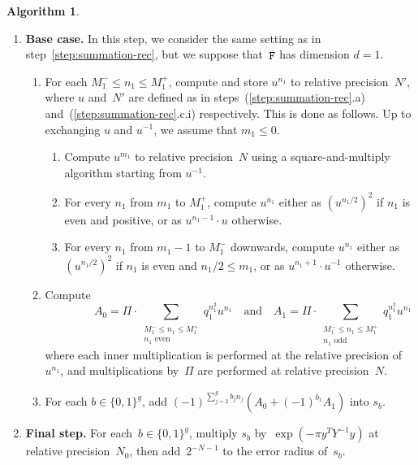 \documentclass[12pt,oneside]{amsart}
\numberwithin{equation}{section}
\theoremstyle{definition}
\newtheorem{algorithm}[equation]{Algorithm}
\DeclareMathOperator{\eldF}{\tt F}
\begin{document}
\begin{algorithm}
\begin{enumerate}
  \item \label{step:summation-base} \textbf{Base case.} In this step, we consider
    the same setting as in step~\eqref{step:summation-rec}, but we suppose
    that~$\eldF$ has dimension $d=1$.
    \begin{enumerate}
    \item For each $M_1^-\leq n_1\leq M_1^+$, compute and store $u^{n_1}$ to
      relative precision~$N'$, where $u$ and~$N'$ are defined as in
      steps~(\ref{step:summation-rec}.a) and~(\ref{step:summation-rec}.c.i)
      respectively. This is done as follows. Up to exchanging $u$ and $u^{-1}$,
      we assume that $m_1\leq 0$.
      \begin{enumerate}
      \item Compute $u^{m_1}$ to relative precision~$N$ using a
        square-and-multiply algorithm starting from $u^{-1}$.
      \item For every $n_1$ from $m_1$ to $M_1^+$, compute $u^{n_1}$ either as
        $(u^{n_1/2})^2$ if $n_1$ is even and positive, or as $u^{n_1-1} \cdot u$ otherwise.
      \item For every $n_1$ from $m_1-1$ to $M_1^-$ downwards, compute
        $u^{n_1}$ either as $(u^{n_1/2})^2$ if $n_1$ is even and
        $n_1/2 \leq m_1$, or as $u^{n_1+1}\cdot u^{-1}$ otherwise.
      \end{enumerate}
    \item Compute
      \begin{displaymath}
        \qquad\qquad
        A_0 = \Pi\cdot \sum_{\substack{M_1^-\leq n_1\leq M_1^+\\ n_1 \text{ even}}} q_1^{n_1^2} u^{n_1}
        \quad\text{and}\quad
        A_1 = \Pi\cdot \sum_{\substack{M_1^-\leq n_1\leq M_1^+\\ n_1 \text{ odd}}} q_1^{n_1^2} u^{n_1}
      \end{displaymath}
      where each inner multiplication is performed at the relative precision
      of~$u^{n_1}$, and multiplications by~$\Pi$ are performed at relative
      precision~$N$.
    \item For each $b\in \{0,1\}^g$, add $(-1)^{\sum_{j=2}^g b_j n_j} (A_0 + (-1)^{b_1} A_1)$ into $s_b$.
    \end{enumerate}
  \item \label{step:summation-output} \textbf{Final step.} For
    each~$b\in \{0,1\}^g$, multiply $s_b$ by~$\exp(-\pi y^T Y^{-1}y)$ at
    relative precision~$N_0$, then add~$2^{-N-1}$ to the error radius of~$s_b$.
  \end{enumerate}
\end{algorithm}
\end{document}
